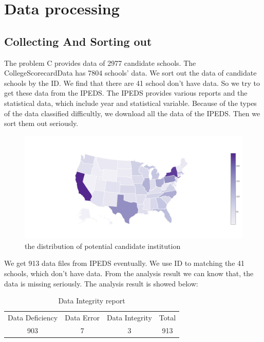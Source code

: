 \documentclass{mcmthesis}
\begin{document}
\section{Data processing}
\subsection{Collecting And Sorting out}
The problem C provides data of 2977 candidate schools. The CollegeScorecardData  has 7804 schools' data. We sort out the data of candidate schools by the ID. We find that there are 41 school don't have data. So we try to get these data from the IPEDS. The IPEDS provides various reports and the statistical data, which include year and statistical variable. Because of the types of the data classified difficultly, we download all the data of the IPEDS. Then we sort them out seriously.\par


\begin{figure}[h]
    \centering
    \includegraphics[width=\linewidth]{figure/number-of-potential-candidate-school}
    \caption{the distribution of potential candidate institution}
    \label{fig:map}
\end{figure}

We get 913 data files from IPEDS eventually. We use ID to matching the 41 schools, which don't have data. From the analysis result we can know that, the data is missing seriously. The analysis result is showed below:

	\begin{table}[h] \renewcommand\arraystretch{1.5}
        \begin{center}
            \begin{footnotesize}
                \begin{tabular}{cccc}
                    \toprule
                    Data Deficiency &Data Error& Data Integrity&Total\\
                    903             &7         &3              &913  \\\bottomrule
                \end{tabular}%
            \end{footnotesize}
            \caption{\footnotesize {Data Integrity report}}
            
        \end{center}
    \end{table}	
\end{document}

